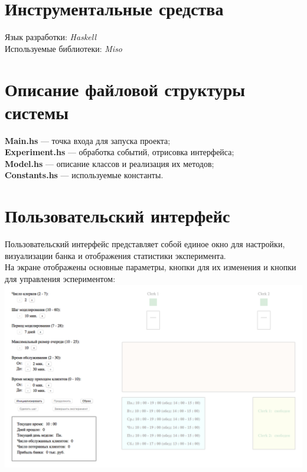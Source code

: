 \documentclass[oneside,final,12pt]{article}
\begin{document}
\section{Инструментальные средства}
Язык разработки: \textit{Haskell}\\

Используемые библиотеки: \textit{Miso}

\section{Описание файловой структуры системы}
\textbf{Main.hs} --- точка входа для запуска проекта;\\

\textbf{Experiment.hs} --- обработка событий, отрисовка интерфейса;\\

\textbf{Model.hs} --- описание классов и реализация их методов;\\

\textbf{Constants.hs} --- используемые константы.\\
\clearpage
\section{Пользовательский интерфейс}
 
Пользовательский интерфейс представляет собой единое окно для настройки, визуализации банка и отображения статистики эксперимента.\\

На экране отображены основные параметры, кнопки для их изменения и кнопки для управления эспериментом:\\

 \includegraphics[width=150mm]{not_inited.png}\\
 
\end{document}
